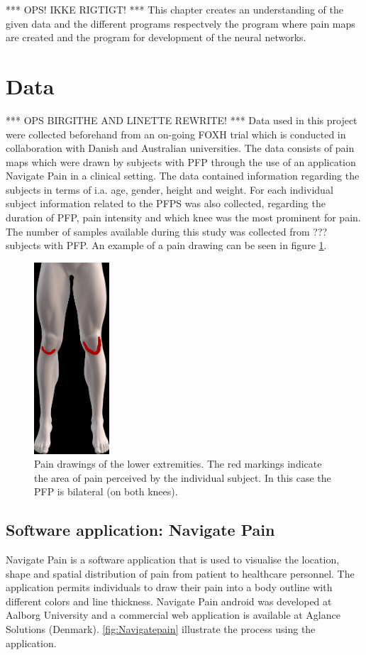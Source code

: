*** OPS! IKKE RIGTIGT! ***
This chapter creates an understanding of the given data and the different programs respectvely the program where pain maps are created and the program for development of the neural networks. 

\section{Data}
*** OPS BIRGITHE AND LINETTE REWRITE! ***
Data used in this project were collected beforehand from an on-going FOXH trial which is conducted in collaboration with Danish and Australian universities. The data consists of pain maps which were drawn by subjects with PFP through the use of an application Navigate Pain in a clinical setting. The data contained information regarding the subjects in terms of i.a. age, gender, height and weight. For each individual subject information related to the PFPS was also collected, regarding the duration of PFP, pain intensity and which knee was the most prominent for pain. 
The number of samples available during this study was collected from ??? subjects with PFP. An example of a pain drawing can be seen in figure \ref{fig:kneepainmap}. 

\begin{figure} [H]
\centering
\includegraphics[width=0.25\textwidth]{figures/kneepainmap}
\caption{Pain drawings of the lower extremities. The red markings indicate the area of pain perceived by the individual subject. In this case the PFP is bilateral (on both knees).}
\label{fig:kneepainmap}
\end{figure}

\subsection{Software application: Navigate Pain}
Navigate Pain is a software application that is used to visualise the location, shape and spatial distribution of pain from patient to healthcare personnel. The application permits individuals to draw their pain into a body outline with different colors and line thickness. Navigate Pain android was developed at Aalborg University and a commercial web application is available at Aglance Solutions (Denmark).\citep{Solutions2015}
\autoref{fig:Navigatepain} illustrate the process using the application.

